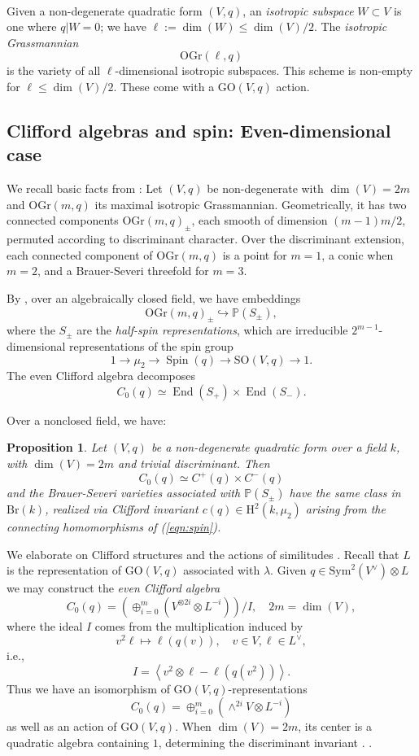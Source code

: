 \documentclass[12pt]{amsart}
\numberwithin{equation}{section}
\newcommand{\ra}{\rightarrow}
\newcommand{\bP}{\mathbb{P}}
\newcommand{\rH}{\mathrm{H}}
\newcommand{\Br}{\mathrm{Br}}
\newcommand{\End}{\operatorname{End}}
\newcommand{\GO}{\mathrm{GO}}
\newcommand{\OGr}{\mathrm{OGr}}
\newcommand{\SO}{\mathrm{SO}}
\newcommand{\Spin}{\operatorname{Spin}}
\newcommand{\Sym}{\mathrm{Sym}}
\theoremstyle{plain}
\newtheorem{prop}{Proposition}[section]
\theoremstyle{definition}
\theoremstyle{remark}
\begin{document}
\

Given a non-degenerate quadratic form $(V,q)$, an {\em isotropic subspace} 
$W\subset V$ is one where $q|W=0$;  we have $\ell:=\dim(W) \le \dim(V)/2$. 
The {\em isotropic
Grassmannian} 
$$
\OGr(\ell,q)
$$
is the variety of all 
$\ell$-dimensional isotropic subspaces. This scheme is non-empty 
for $\ell \le \dim(V)/2$.  These come with a $\GO(V,q)$ action.

\subsection*{Clifford algebras and spin: Even-dimensional case}


We recall basic facts from \cite[\S 85]{EKMbook}:
Let $(V,q)$ be non-degenerate with $\dim(V)=2m$ and $\OGr(m,q)$ its
maximal isotropic Grassmannian. Geometrically, it has two connected components $\OGr(m,q)_{\pm}$, each smooth
of dimension $(m-1)m/2$, permuted according to discriminant character.
Over the discriminant extension, each connected component of $\OGr(m,q)$ is a point for $m=1$, a conic when $m=2$,
and a Brauer-Severi threefold for $m=3$. 

 
By \cite[pp. 387-390]{FulHar}, over an algebraically closed field, we have embeddings 
$$
\OGr(m,q)_{\pm} \hookrightarrow \bP(S_{\pm}),
$$
where the $S_{\pm}$ are the {\em half-spin representations}, which are irreducible $2^{m-1}$-dimensional representations of the spin group
\begin{equation}
\label{eqn:spin}
1 \rightarrow \mu_2 \ra \Spin(q) \rightarrow \SO(V,q) \rightarrow 1.
\end{equation}
The even Clifford algebra decomposes \cite[p.~305]{FulHar}
$$
C_0(q) \simeq \End(S_+) \times \End(S_-).
$$

Over a nonclosed field, we have:
\begin{prop} \cite[Rem.~13.9]{EKMbook} 
\label{prop:spinAmitsur}
Let $(V,q)$ be a non-degenerate quadratic form over a field $k$, with $\dim(V)=2m$ and trivial discriminant.
Then 
$$C_0(q) \simeq C^+(q) \times C^-(q)$$
and the Brauer-Severi varieties associated with $\bP(S_{\pm})$ have the same class in $\Br(k)$, realized via Clifford invariant 
$c(q) \in \rH^2(k,\mu_2)$ arising from the connecting homomorphisms of (\ref{eqn:spin}).
\end{prop}

We elaborate on Clifford structures and the actions of similitudes \cite[\S 13.A]{KMRT}. 
Recall that $L$ is the representation of $\GO(V,q)$ associated with $\lambda$.
Given $q \in \Sym^2(V^{\vee})\otimes L$ we may construct the {\em even Clifford algebra}
$$C_0(q) = \left( \oplus_{i=0}^m (V^{\otimes 2i}\otimes L^{-i}) \right)/I, \quad 2m=\dim(V),$$
where the ideal $I$ comes from the multiplication induced by
$$v^2 \ell \mapsto \ell(q(v)), \quad v\in V, \ell \in L^{\vee},
$$
i.e.,
$$I=\left< v^2 \otimes \ell - \ell(q(v^2)) \right>.$$
Thus we have an isomorphism of $\GO(V,q)$-representations
$$C_0(q) = \oplus_{i=0}^m (\wedge^{2i} V \otimes L^{-i})$$
as well as an action of $\GO(V,q)$. 
When $\dim(V)=2m$, its center
is a quadratic algebra containing $1$, determining
the discriminant invariant \cite[Prop. 11.6]{EKMbook}.
. 
\end{document}
